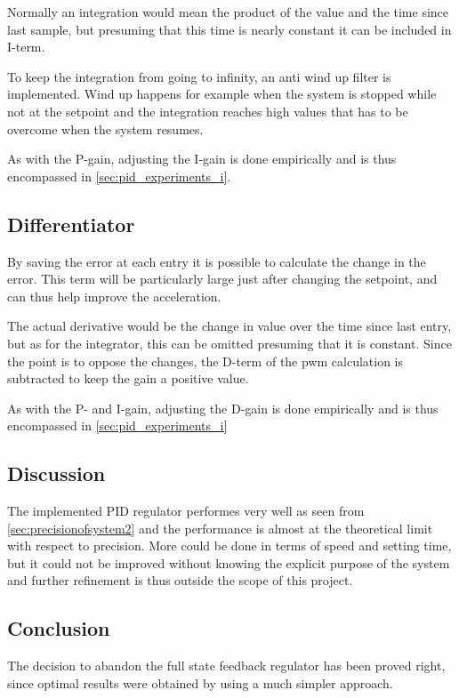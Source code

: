 Normally an integration would mean the product of the value and the time since last sample, but presuming that this time is nearly constant it can be included in I-term. 

To keep the integration from going to infinity, an anti wind up filter is implemented. Wind up happens for example when the system is stopped while not at the setpoint and the integration reaches high values that has to be overcome when the system resumes.

As with the P-gain, adjusting the I-gain is done empirically and is thus encompassed in \ref{sec:pid_experiments_i}.

\subsection{Differentiator}
By saving the error at each entry it is possible to calculate the change in the error. This term will be particularly large just after changing the setpoint, and can thus help improve the acceleration. 

The actual derivative would be the change in value over the time since last entry, but as for the integrator, this can be omitted presuming that it is constant. Since the point is to oppose the changes, the D-term of the pwm calculation is subtracted to keep the gain a positive value.

As with the P- and I-gain, adjusting the D-gain is done empirically and is thus encompassed in \ref{sec:pid_experiments_i}


\subsection{Discussion}
The implemented PID regulator performes very well as seen from \ref{sec:precisionofsystem2} and the performance is almost at the theoretical limit with respect to precision. More could be done in terms of speed and setting time, but it could not be improved without knowing the explicit purpose of the system and further refinement is thus outside the scope of this project.

\subsection{Conclusion}
The decision to abandon the full state feedback regulator has been proved right, since optimal results were obtained by using a much simpler approach.












